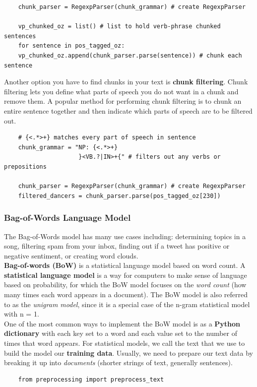 \documentclass[11pt, a4paper]{article}
\begin{document}
\begin{spacing}{1.1}
\begin{lstlisting}
	chunk_parser = RegexpParser(chunk_grammar) # create RegexpParser
	
	vp_chunked_oz = list() # list to hold verb-phrase chunked sentences
	for sentence in pos_tagged_oz:
	vp_chunked_oz.append(chunk_parser.parse(sentence)) # chunk each sentence \end{lstlisting} \newpage

	\noindent Another option you have to find chunks in your text is \textbf{chunk filtering}. Chunk filtering lets you define what parts of speech you do not want in a chunk and remove them. A popular method for performing chunk filtering is to chunk an entire sentence together and then indicate which parts of speech are to be filtered out. 
	\begin{lstlisting}
	# {<.*>+} matches every part of speech in sentence
	chunk_grammar = "NP: {<.*>+}
	                 }<VB.?|IN>+{" # filters out any verbs or prepositions
	
	chunk_parser = RegexpParser(chunk_grammar) # create RegexpParser
	filtered_dancers = chunk_parser.parse(pos_tagged_oz[230])\end{lstlisting} \vspace*{1mm}
	
	\subsubsection{Bag-of-Words Language Model}
	The Bag-of-Words model has many use cases including: determining topics in a song, filtering spam from your inbox, finding out if a tweet has positive or negative sentiment, or creating word clouds. \vspace*{1.5mm} \\
	\textbf{Bag-of-words (BoW)} is a statistical language model based on word count. A \textbf{statistical language model} is a way for computers to make sense of language based on probability, for which the BoW model focuses on the \textit{word count} (how many times each word appears in a document). The BoW model is also referred to as the \textit{unigram model}, since it is a special case of the n-gram statistical model with n = 1. \vspace*{1.5mm} \\
	One of the most common ways to implement the BoW model is as a \textbf{Python dictionary} with each key set to a word and each value set to the number of times that word appears. For statistical models, we call the text that we use to build the model our \textbf{training data}. Usually, we need to prepare our text data by breaking it up into \textit{documents} (shorter strings of text, generally sentences).
	\begin{lstlisting}
	from preprocessing import preprocess_text
	

\end{lstlisting}
\end{spacing}
\end{document}
